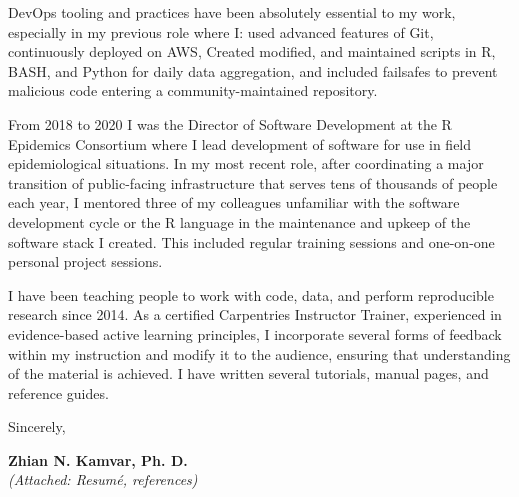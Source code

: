 DevOps tooling and practices have been absolutely essential to my work, especially
in my previous role where I: used advanced features of Git, continuously deployed
on AWS, Created modified, and maintained scripts in R, BASH, and Python for daily
data aggregation, and included failsafes to prevent malicious code entering a community-maintained repository. 


\vspace{2ex}

From 2018 to 2020 I was the Director of Software Development at the R Epidemics Consortium where I lead development of software for use in field epidemiological situations. In my most recent role, after coordinating a major transition of public-facing infrastructure that serves tens of thousands of people each year, I mentored
three of my colleagues unfamiliar with the software development cycle or the R language in the maintenance and upkeep of the software stack I created. This included regular training sessions and one-on-one personal project sessions. 

\vspace{2ex}

I have been teaching people to work with code, data, and perform
reproducible research since 2014. As a certified Carpentries Instructor
Trainer, experienced in evidence-based active learning principles, I incorporate several forms of feedback within my instruction and modify it to the audience, ensuring that understanding of the material is achieved. I have written several tutorials, manual pages, and reference guides.

\vspace{3ex}

Sincerely,

\vspace{4ex}

\textbf{Zhian N. Kamvar, Ph. D.}\\
{\footnotesize \textit{(Attached: Resum\'{e}, references)}}

\clearpage



